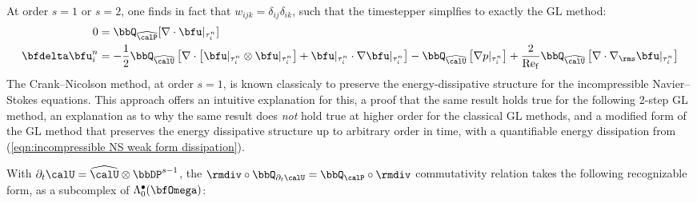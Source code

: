 \begin{example}
        At order $s = 1$ or $s = 2$, one finds in fact that $w_{ijk} = \delta_{ij}\delta_{ik}$, such that the timestepper simplfies to exactly the GL method:
        \begin{align}
                               0  &=  \bbQ_{\widehat{\calP}}[\nabla\cdot\bfu|_{\tau^{n}_{i}}]  \\
            \bfdelta\bfu^{n}_{i}  &=  - \frac{1}{2}\bbQ_{\widehat{\calU}}\left[\nabla\cdot\left[\bfu|_{\tau^{n}_{i}}\otimes\bfu|_{\tau^{n}_{i}}\right] + \bfu|_{\tau^{n}_{i}}\cdot\nabla\bfu|_{\tau^{n}_{i}}\right] - \bbQ_{\widehat{\calU}}\left[\nabla p|_{\tau^{n}_{i}}\right] + \frac{2}{\rmRef}\bbQ_{\widehat{\calU}}\left[\nabla\cdot\nabla_{\rms}\bfu|_{\tau^{n}_{i}}\right]
        \end{align}
        The Crank--Nicolson method, at order $s = 1$, is known classicaly to preserve the energy-dissipative structure for the incompressible Navier--Stokes equations. \BA{[Ref]} This approach offers an intuitive explanation for this, a proof that the same result holds true for the following 2-step GL method, an explanation as to why the same result does \emph{not} hold true at higher order for the classical GL methods, and a modified form of the GL method that preserves the energy dissipative structure up to arbitrary order in time, with a quantifiable energy dissipation from (\ref{eqn:incompressible NS weak form dissipation}).
        
        With $\partial_{t}\calU = \widehat{\calU}\otimes\bbDP^{s - 1}$, the $\rmdiv\circ\bbQ_{\partial_{t}\calU} = \bbQ_{\calP}\circ\rmdiv$ commutativity relation takes the following recognizable form, as a subcomplex of $\Lambda_{0}^{\bullet}(\bfOmega)$:
        \begin{center}\end{center}
    \end{example}
